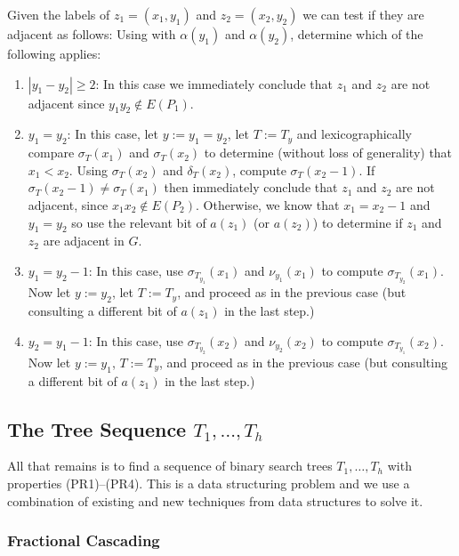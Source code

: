 \documentclass[kpfonts]{patmorin}
\begin{document}
Given the labels of $z_1=(x_1,y_1)$ and $z_2=(x_2,y_2)$ we can test if they are adjacent as follows: Using  with $\alpha(y_1)$ and $\alpha(y_2)$, determine which of the following applies:
\begin{enumerate}
  \item $|y_1-y_2|\ge 2$: In this case we immediately conclude that $z_1$ and $z_2$ are not adjacent since $y_1y_2\not\in E(P_1)$.  
  
  \item $y_1=y_2$: In this case, let $y:=y_1=y_2$, let $T:=T_y$ and lexicographically compare $\sigma_T(x_1)$ and $\sigma_T(x_2)$ to determine (without loss of generality) that $x_1<x_2$.  Using $\sigma_{T}(x_2)$ and $\delta_{T}(x_2)$, compute $\sigma_T(x_2-1)$.  If $\sigma_T(x_2-1)\neq \sigma_T(x_1)$ then immediately conclude that $z_1$ and $z_2$ are not adjacent, since $x_1x_2\not\in E(P_2)$.  Otherwise, we know that $x_1=x_2-1$ and $y_1=y_2$ so use the relevant bit of $a(z_1)$ (or $a(z_2)$) to determine if $z_1$ and $z_2$ are adjacent in $G$.
  
  \item $y_1=y_2-1$: In this case, use $\sigma_{T_{y_1}}(x_1)$ and $\nu_{y_1}(x_1)$ to compute $\sigma_{T_{y_2}}(x_1)$.  Now let $y:=y_2$, let $T:=T_{y}$, and proceed as in the previous case (but consulting a different bit of $a(z_1)$ in the last step.)
  
  \item $y_2=y_1-1$: In this case, use $\sigma_{T_{y_2}}(x_2)$ and $\nu_{y_2}(x_2)$ to compute $\sigma_{T_{y_1}}(x_2)$.  Now let $y:=y_1$, $T:=T_{y}$, and proceed as in the previous case (but consulting a different bit of $a(z_1)$ in the last step.)
\end{enumerate}


\subsection{The Tree Sequence $T_1,\ldots,T_h$}

All that remains is to find a sequence of binary search trees $T_1,\ldots,T_h$ with properties (PR1)--(PR4). This is a data structuring problem and we use a combination of existing and new techniques from data structures to solve it.

\subsubsection{Fractional Cascading}
\end{document}
